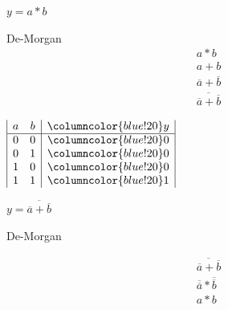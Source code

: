 \documentclass{article}
\begin{document}
\noindent\begin{minipage}{.45\linewidth}
    \begin{center} $y = a * b$ \end{center}
    De-Morgan
    \begin{gather*} 
        a * b \\ 
        a + b \\ 
        \overline{a} + \overline{b}  \\
       \overline{\overline{a} + \overline{b}} 
     \end{gather*}

    \vspace{2em}
    \center
    \begin{multicols}{2}

        $\begin{array}{|c c | >{\columncolor{blue!20}}c |}
            a & b &  y \\
            \hline 
            0 & 0 & 0 \\ 
            0 & 1 & 0 \\
            1 & 0 & 0 \\
            1 & 1 & 1 \\
        \end{array}$ \\ 
    \end{multicols}
\end{minipage} \begin{minipage}{.48\linewidth}
    \begin{center} $y =   \overline{\overline{a} + \overline{b}} $ \end{center}

    De-Morgan

    \begin{gather*} 
        \overline{\overline{a}   + \overline{b}} \\ 
        \overline{\overline{a}}  *   \overline{\overline{b}}  \\
         a * b
     \end{gather*}


\end{minipage}
\end{document}
